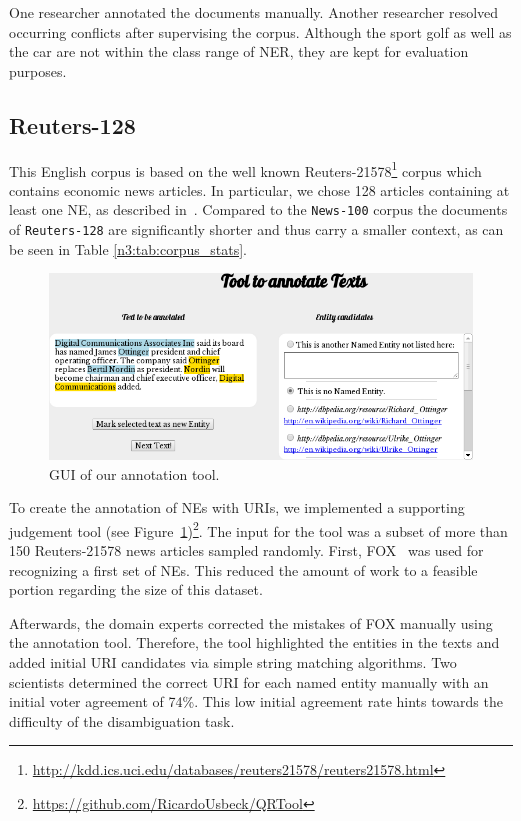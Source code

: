 One researcher annotated the documents manually.
Another researcher resolved occurring conflicts after supervising the corpus.
Although the sport golf as well as the car are not within the class range of NER, they are kept for evaluation purposes.

\subsection{Reuters-128}

This English corpus is based on the well known Reuters-21578\footnote{\url{http://kdd.ics.uci.edu/databases/reuters21578/reuters21578.html}} corpus which contains economic news articles.
In particular, we chose 128 articles containing at least one NE, as described in~\cite{agdistis_iswc}.
Compared to the \texttt{News-100} corpus the documents of \texttt{Reuters-128} are significantly shorter and thus carry a smaller context, as can be seen in Table \ref{n3:tab:corpus_stats}.
\begin{figure}[tb]
\centering
\includegraphics[width=\linewidth]{part_02/benchmarking/LREC_N3NIFNERNED/qrtool.png}
\caption{GUI of our annotation tool.}
\label{n3:fig:qrtool}
\end{figure}

To create the annotation of NEs with URIs, we implemented a supporting judgement tool (see Figure~\ref{n3:fig:qrtool})\footnote{\url{https://github.com/RicardoUsbeck/QRTool}}. The input for the tool was a subset of more than 150 Reuters-21578 news articles sampled randomly.
First, FOX~\cite{FOX} was used for recognizing a first set of NEs. 
This reduced the amount of work to a feasible portion regarding the size of this dataset.

Afterwards, the domain experts corrected the  mistakes of FOX manually using the annotation tool.
Therefore, the tool highlighted the entities in the texts and added initial URI candidates via simple string matching algorithms.
Two scientists determined the correct URI for each named entity manually with an initial voter agreement of 74\%.
This low initial agreement rate hints towards the difficulty of the disambiguation task.

